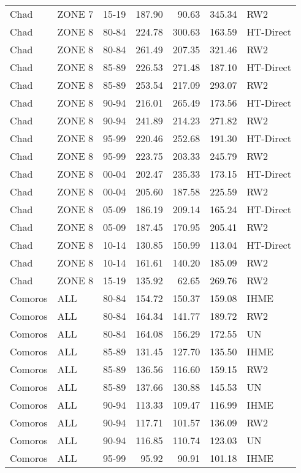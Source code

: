 \begin{longtable}{lllrrrl}
  Chad & ZONE 7 & 15-19 & 187.90 & 90.63 & 345.34 & RW2 \\ 
  Chad & ZONE 8 & 80-84 & 224.78 & 300.63 & 163.59 & HT-Direct \\ 
  Chad & ZONE 8 & 80-84 & 261.49 & 207.35 & 321.46 & RW2 \\ 
  Chad & ZONE 8 & 85-89 & 226.53 & 271.48 & 187.10 & HT-Direct \\ 
  Chad & ZONE 8 & 85-89 & 253.54 & 217.09 & 293.07 & RW2 \\ 
  Chad & ZONE 8 & 90-94 & 216.01 & 265.49 & 173.56 & HT-Direct \\ 
  Chad & ZONE 8 & 90-94 & 241.89 & 214.23 & 271.82 & RW2 \\ 
  Chad & ZONE 8 & 95-99 & 220.46 & 252.68 & 191.30 & HT-Direct \\ 
  Chad & ZONE 8 & 95-99 & 223.75 & 203.33 & 245.79 & RW2 \\ 
  Chad & ZONE 8 & 00-04 & 202.47 & 235.33 & 173.15 & HT-Direct \\ 
  Chad & ZONE 8 & 00-04 & 205.60 & 187.58 & 225.59 & RW2 \\ 
  Chad & ZONE 8 & 05-09 & 186.19 & 209.14 & 165.24 & HT-Direct \\ 
  Chad & ZONE 8 & 05-09 & 187.45 & 170.95 & 205.41 & RW2 \\ 
  Chad & ZONE 8 & 10-14 & 130.85 & 150.99 & 113.04 & HT-Direct \\ 
  Chad & ZONE 8 & 10-14 & 161.61 & 140.20 & 185.09 & RW2 \\ 
  Chad & ZONE 8 & 15-19 & 135.92 & 62.65 & 269.76 & RW2 \\ 
  Comoros & ALL & 80-84 & 154.72 & 150.37 & 159.08 & IHME \\ 
  Comoros & ALL & 80-84 & 164.34 & 141.77 & 189.72 & RW2 \\ 
  Comoros & ALL & 80-84 & 164.08 & 156.29 & 172.55 & UN \\ 
  Comoros & ALL & 85-89 & 131.45 & 127.70 & 135.50 & IHME \\ 
  Comoros & ALL & 85-89 & 136.56 & 116.60 & 159.15 & RW2 \\ 
  Comoros & ALL & 85-89 & 137.66 & 130.88 & 145.53 & UN \\ 
  Comoros & ALL & 90-94 & 113.33 & 109.47 & 116.99 & IHME \\ 
  Comoros & ALL & 90-94 & 117.71 & 101.57 & 136.09 & RW2 \\ 
  Comoros & ALL & 90-94 & 116.85 & 110.74 & 123.03 & UN \\ 
  Comoros & ALL & 95-99 & 95.92 & 90.91 & 101.18 & IHME \\ 

\end{longtable}
